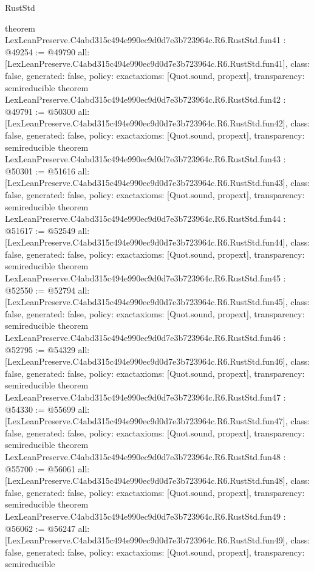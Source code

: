 \begin{lexlean}{RustStd}
\begin{coremodule}
{}
theorem LexLeanPreserve.C4abd315c494e990ec9d0d7e3b723964c.R6.RustStd.fun41 : @49254 := @49790 {
  all: [LexLeanPreserve.C4abd315c494e990ec9d0d7e3b723964c.R6.RustStd.fun41],
  class: false,
  generated: false,
  policy: exact{axioms: [Quot.sound, propext]},
  transparency: semireducible
}
theorem LexLeanPreserve.C4abd315c494e990ec9d0d7e3b723964c.R6.RustStd.fun42 : @49791 := @50300 {
  all: [LexLeanPreserve.C4abd315c494e990ec9d0d7e3b723964c.R6.RustStd.fun42],
  class: false,
  generated: false,
  policy: exact{axioms: [Quot.sound, propext]},
  transparency: semireducible
}
theorem LexLeanPreserve.C4abd315c494e990ec9d0d7e3b723964c.R6.RustStd.fun43 : @50301 := @51616 {
  all: [LexLeanPreserve.C4abd315c494e990ec9d0d7e3b723964c.R6.RustStd.fun43],
  class: false,
  generated: false,
  policy: exact{axioms: [Quot.sound, propext]},
  transparency: semireducible
}
theorem LexLeanPreserve.C4abd315c494e990ec9d0d7e3b723964c.R6.RustStd.fun44 : @51617 := @52549 {
  all: [LexLeanPreserve.C4abd315c494e990ec9d0d7e3b723964c.R6.RustStd.fun44],
  class: false,
  generated: false,
  policy: exact{axioms: [Quot.sound, propext]},
  transparency: semireducible
}
theorem LexLeanPreserve.C4abd315c494e990ec9d0d7e3b723964c.R6.RustStd.fun45 : @52550 := @52794 {
  all: [LexLeanPreserve.C4abd315c494e990ec9d0d7e3b723964c.R6.RustStd.fun45],
  class: false,
  generated: false,
  policy: exact{axioms: [Quot.sound, propext]},
  transparency: semireducible
}
theorem LexLeanPreserve.C4abd315c494e990ec9d0d7e3b723964c.R6.RustStd.fun46 : @52795 := @54329 {
  all: [LexLeanPreserve.C4abd315c494e990ec9d0d7e3b723964c.R6.RustStd.fun46],
  class: false,
  generated: false,
  policy: exact{axioms: [Quot.sound, propext]},
  transparency: semireducible
}
theorem LexLeanPreserve.C4abd315c494e990ec9d0d7e3b723964c.R6.RustStd.fun47 : @54330 := @55699 {
  all: [LexLeanPreserve.C4abd315c494e990ec9d0d7e3b723964c.R6.RustStd.fun47],
  class: false,
  generated: false,
  policy: exact{axioms: [Quot.sound, propext]},
  transparency: semireducible
}
theorem LexLeanPreserve.C4abd315c494e990ec9d0d7e3b723964c.R6.RustStd.fun48 : @55700 := @56061 {
  all: [LexLeanPreserve.C4abd315c494e990ec9d0d7e3b723964c.R6.RustStd.fun48],
  class: false,
  generated: false,
  policy: exact{axioms: [Quot.sound, propext]},
  transparency: semireducible
}
theorem LexLeanPreserve.C4abd315c494e990ec9d0d7e3b723964c.R6.RustStd.fun49 : @56062 := @56247 {
  all: [LexLeanPreserve.C4abd315c494e990ec9d0d7e3b723964c.R6.RustStd.fun49],
  class: false,
  generated: false,
  policy: exact{axioms: [Quot.sound, propext]},
  transparency: semireducible
}
\end{coremodule}
\end{lexlean}
